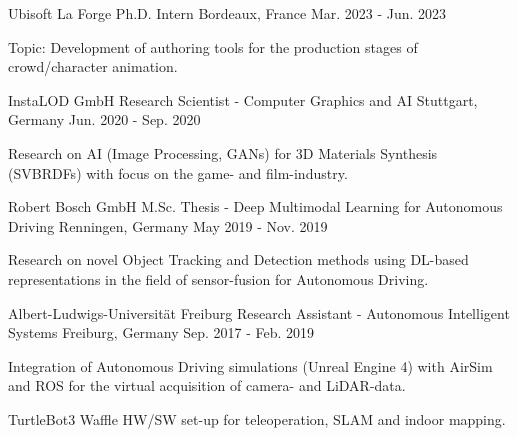 

\begin{cventries}

  \cventry
    {Ubisoft La Forge} %
    {Ph.D. Intern} %
    {Bordeaux, France} %
    {Mar. 2023 - Jun. 2023} %
    {
      \begin{cvitems} %
        \item {Topic: Development of authoring tools for the production stages of crowd/character animation.}
      \end{cvitems}
    }

\cventry
    {InstaLOD GmbH} %
    {Research Scientist - Computer Graphics and AI} %
    {Stuttgart, Germany} %
    {Jun. 2020 - Sep. 2020} %
    {
      \begin{cvitems} %
        \item {Research on AI (Image Processing, GANs) for 3D Materials Synthesis (SVBRDFs) with focus on the game- and film-industry.}
      \end{cvitems}
    }

\cventry
    {Robert Bosch GmbH} %
    {M.Sc. Thesis - Deep Multimodal Learning for Autonomous Driving} %
    {Renningen, Germany} %
    {May 2019 - Nov. 2019} %
    {
      \begin{cvitems} %
        \item {Research on novel Object Tracking and Detection methods using DL-based representations in the field of sensor-fusion for Autonomous Driving.}
      \end{cvitems}
    }

\cventry
    {Albert-Ludwigs-Universität Freiburg} %
    {Research Assistant - Autonomous Intelligent Systems} %
    {Freiburg, Germany} %
    {Sep. 2017 - Feb. 2019} %
    {
      \begin{cvitems} %
        \item {Integration of Autonomous Driving simulations (Unreal Engine 4) with AirSim and ROS for the virtual acquisition of camera- and LiDAR-data.}
        \item {TurtleBot3 Waffle HW/SW set-up for teleoperation, SLAM and indoor mapping.}
      \end{cvitems}
    }


\end{cventries}
